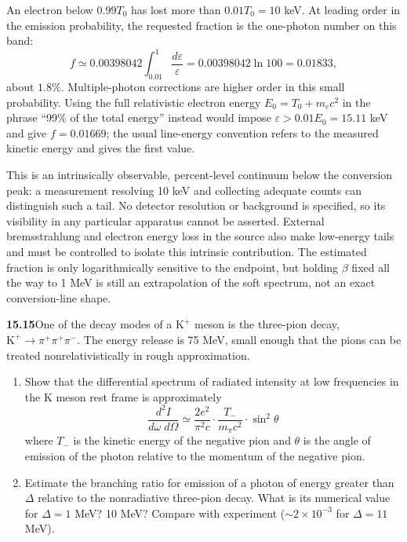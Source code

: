 An electron below $0.99T_0$ has lost more than $0.01T_0=10$ keV.
At leading order in the emission probability, the requested fraction
is the one-photon number on this band:
\[
\boxed{f\simeq0.00398042\int_{0.01}^{1}\frac{d\varepsilon}{\varepsilon}
=0.00398042\ln100=0.01833,}
\]
about $1.8\%$.  Multiple-photon corrections are higher order in
this small probability.  Using the full relativistic electron energy
$E_0=T_0+m_ec^2$ in the phrase ``99\% of the total energy'' instead
would impose $\varepsilon>0.01E_0=15.11$ keV and give $f=0.01669$;
the usual line-energy convention refers to the measured kinetic
energy and gives the first value.

This is an intrinsically observable, percent-level continuum below
the conversion peak: a measurement resolving 10 keV and collecting
adequate counts can distinguish such a tail.  No detector resolution
or background is specified, so its visibility in any particular
apparatus cannot be asserted.  External bremsstrahlung and electron
energy loss in the source also make low-energy tails and must be
controlled to isolate this intrinsic contribution.  The estimated
fraction is only logarithmically sensitive to the endpoint, but
holding $\beta$ fixed all the way to 1 MeV is still an extrapolation
of the soft spectrum, not an exact conversion-line shape.


\par\bigskip
\noindent\textbf{15.15}\quad One of the decay modes of a $\mathrm{K}^{+}$ meson is the three-pion decay, $\mathrm{K}^{+}\to\pi^{+}\pi^{+}\pi^{-}$. The energy release is 75 MeV, small enough that the pions can be treated nonrelativistically in rough approximation.
\begin{enumerate}
\item[(a)] Show that the differential spectrum of radiated intensity at low frequencies in the K meson rest frame is approximately
\[
\frac{d^{2}I}{d\omega\;d\Omega}\simeq\frac{2e^{2}}{\pi^{2}c}\cdot\frac{T_{-}}{m_{\pi}c^{2}}\cdot\sin^{2}\theta
\]
where $T_{-}$ is the kinetic energy of the negative pion and $\theta$ is the angle of emission of the photon relative to the momentum of the negative pion.
\item[(b)] Estimate the branching ratio for emission of a photon of energy greater than $\Delta$ relative to the nonradiative three-pion decay. What is its numerical value for $\Delta=1$ MeV? 10 MeV? Compare with experiment ($\sim2\times10^{-3}$ for $\Delta=11$ MeV).
\end{enumerate}
\solution

